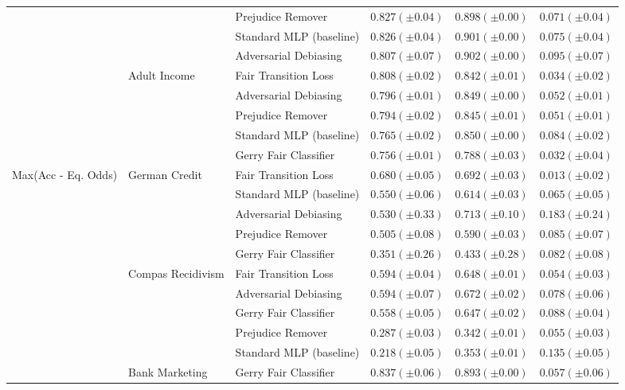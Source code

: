 \begin{tabular}{llllll}
 &  & Prejudice Remover & $0.827 (\pm0.04)$ & $0.898 (\pm0.00)$ & $0.071 (\pm0.04)$ \\
 &  & Standard MLP (baseline) & $0.826 (\pm0.04)$ & $0.901 (\pm0.00)$ & $0.075 (\pm0.04)$ \\
 &  & Adversarial Debiasing & $0.807 (\pm0.07)$ & $0.902 (\pm0.00)$ & $0.095 (\pm0.07)$ \\
\cline{2-6}
 & \multirow[t]{5}{*}{Adult Income} & Fair Transition Loss & $0.808 (\pm0.02)$ & $0.842 (\pm0.01)$ & $0.034 (\pm0.02)$ \\
 &  & Adversarial Debiasing & $0.796 (\pm0.01)$ & $0.849 (\pm0.00)$ & $0.052 (\pm0.01)$ \\
 &  & Prejudice Remover & $0.794 (\pm0.02)$ & $0.845 (\pm0.01)$ & $0.051 (\pm0.01)$ \\
 &  & Standard MLP (baseline) & $0.765 (\pm0.02)$ & $0.850 (\pm0.00)$ & $0.084 (\pm0.02)$ \\
 &  & Gerry Fair Classifier & $0.756 (\pm0.01)$ & $0.788 (\pm0.03)$ & $0.032 (\pm0.04)$ \\
\cline{1-6} \cline{2-6}
\multirow[t]{20}{*}{Max(Acc - Eq. Odds)} & \multirow[t]{5}{*}{German Credit} & Fair Transition Loss & $0.680 (\pm0.05)$ & $0.692 (\pm0.03)$ & $0.013 (\pm0.02)$ \\
 &  & Standard MLP (baseline) & $0.550 (\pm0.06)$ & $0.614 (\pm0.03)$ & $0.065 (\pm0.05)$ \\
 &  & Adversarial Debiasing & $0.530 (\pm0.33)$ & $0.713 (\pm0.10)$ & $0.183 (\pm0.24)$ \\
 &  & Prejudice Remover & $0.505 (\pm0.08)$ & $0.590 (\pm0.03)$ & $0.085 (\pm0.07)$ \\
 &  & Gerry Fair Classifier & $0.351 (\pm0.26)$ & $0.433 (\pm0.28)$ & $0.082 (\pm0.08)$ \\
\cline{2-6}
 & \multirow[t]{5}{*}{Compas Recidivism} & Fair Transition Loss & $0.594 (\pm0.04)$ & $0.648 (\pm0.01)$ & $0.054 (\pm0.03)$ \\
 &  & Adversarial Debiasing & $0.594 (\pm0.07)$ & $0.672 (\pm0.02)$ & $0.078 (\pm0.06)$ \\
 &  & Gerry Fair Classifier & $0.558 (\pm0.05)$ & $0.647 (\pm0.02)$ & $0.088 (\pm0.04)$ \\
 &  & Prejudice Remover & $0.287 (\pm0.03)$ & $0.342 (\pm0.01)$ & $0.055 (\pm0.03)$ \\
 &  & Standard MLP (baseline) & $0.218 (\pm0.05)$ & $0.353 (\pm0.01)$ & $0.135 (\pm0.05)$ \\
\cline{2-6}
 & \multirow[t]{5}{*}{Bank Marketing} & Gerry Fair Classifier & $0.837 (\pm0.06)$ & $0.893 (\pm0.00)$ & $0.057 (\pm0.06)$ \\

\end{tabular}
